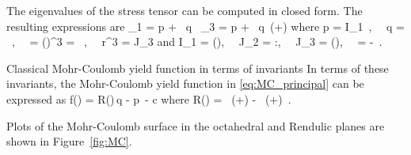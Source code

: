 The eigenvalues of the stress tensor can be computed in closed form.  The resulting expressions
are
\Beq \label{eq:stress_eig}
  \sigma_1 = p + ~q~\cos\theta \quad \Tand \quad
  \sigma_3 = p + ~q~\cos\left(\theta+\right) 
\Eeq
where
\Beq
  p =  I_1~,~~ q = ~,~~
  \theta = \left(\right)^3 =   ~,~~
  r^3 =  J_3
\Eeq
and
\Beq
  I_1 = \Tr(\Bsig),~~ J_2 =  \Bs:\Bs,~~ J_3 = \det(\Bs),~~ \Bs = \Bsig -  \BI \,.
\Eeq
\begin{SummaryBox}[label=box:MC_invariant]{Classical Mohr-Coulomb yield function in terms of invariants}
In terms of these invariants, the Mohr-Coulomb yield function in \eqref{eq:MC_principal} can be expressed as
\Beq \label{eq:MC_invariant}
  f(\Bsig) = R(\theta)\,q - p~\sin\phi - c\cos\phi  
\Eeq
where 
\Beq \label{eq:R_theta}
  R(\theta) = ~\sin\left(\theta+\right) - 
              \sin\phi~\cos\left(\theta+\right) \,.
\Eeq
\end{SummaryBox}
Plots of the Mohr-Coulomb surface in the octahedral and Rendulic planes are shown in Figure~\ref{fig:MC}.

